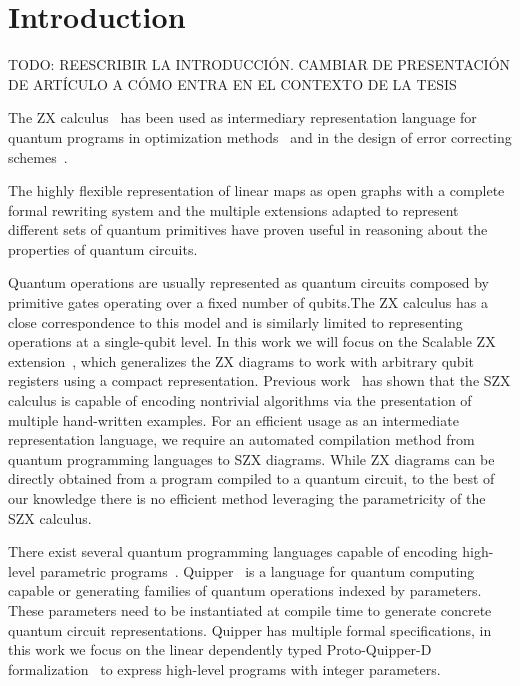 \section{Introduction}%
\label{sec:introduction}

{\color{red}TODO: REESCRIBIR LA INTRODUCCIÓN. CAMBIAR DE PRESENTACIÓN DE ARTÍCULO A CÓMO ENTRA EN EL CONTEXTO DE LA TESIS}

The ZX calculus~\cite{vdw_working_cs_zx} has been used as intermediary representation language for quantum programs in optimization methods~\cite{DKPW2019qcircSimpl,borgna_hybrid_2021,Backens_2021} and in the design of error correcting schemes~\cite{de_beaudrap_zx_2020}.

The highly flexible representation of linear maps as open graphs with a complete formal rewriting system and the multiple extensions adapted to represent different sets of quantum primitives have proven useful in reasoning about the properties of quantum circuits.

Quantum operations are usually represented as quantum circuits composed by primitive gates operating over a fixed number of qubits.The ZX calculus has a close correspondence to this model and is similarly limited to representing operations at a single-qubit level.
%
In this work we will focus on the Scalable ZX extension~\cite{carette_szx-calculus_2019}, which generalizes the ZX diagrams to work with arbitrary qubit registers using a compact representation. Previous work~\cite{carette_quantum_2021} has shown that the SZX calculus is capable of encoding nontrivial algorithms via the presentation of multiple hand-written examples. For an efficient usage as an intermediate representation language, we require an automated compilation method from quantum programming languages to SZX diagrams. While ZX diagrams can be directly obtained from a program compiled to a quantum circuit, to the best of our knowledge there is no efficient method leveraging the parametricity of the SZX calculus.

There exist several quantum programming languages capable of encoding high-level parametric programs~\cite{qiskit,cirq,Steiger2018projectQ}. Quipper~\cite{Green2013quipper} is a language for quantum computing capable or generating families of quantum operations indexed by parameters. These parameters need to be instantiated at compile time to generate concrete quantum circuit representations. Quipper has multiple formal specifications, in this work we focus on the linear dependently typed Proto-Quipper-D formalization~\cite{fu_linear_2021,fu_tutorial_2020} to express high-level programs with integer parameters.

